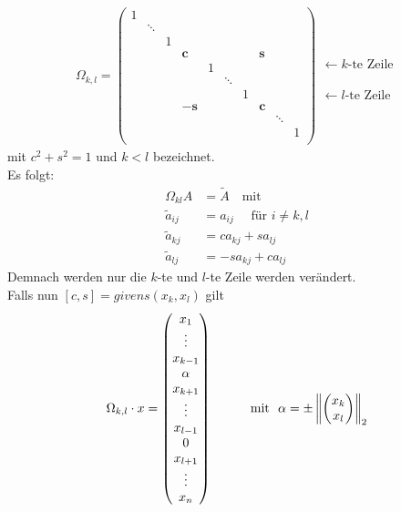 \begin{gather}
\Omega _{k,l} = \begin{pmatrix}
1 &&&&&&&&& \\
& \ddots\\
&& 1\\
&&& \mathbf{c} &&&& \mathbf{s} \\
&&&& 1\\
&&&&& \ddots \\
&&&&&& 1\\
&&& -\mathbf{s} &&&& \mathbf{c} \\
&&&&&&&& \ddots \\
&&&&&&&&& 1\\
\end{pmatrix}
\begin{array}{l}
\\   \leftarrow \text{$k$-te Zeile}
\\ \\ \\ \\ \leftarrow \text{$l$-te Zeile}
\end{array}
\label{VI.4.5}
\end{gather}
mit $c^2+s^2=1$ und $k<l$ bezeichnet.\\
Es folgt:
\begin{align*}
\Omega_{kl} A &= \widetilde{A} \quad \text{mit} \\
\widetilde{a}_{ij}  &= a_{ij} \quad \text{ für } i\neq k,l \\
\widetilde{a}_{kj} & = ca_{kj}+sa_{lj} \\
\widetilde{a}_{lj} & = -sa_{kj} + ca_{lj}
\end{align*}
Demnach werden nur die $k$-te und $l$-te Zeile werden verändert. \\
Falls nun $[c,s] = givens(x_k, x_l)$ gilt
\begin{gather*}
\Omega_{k,l}\cdot x = \begin{pmatrix}
x_1 \\ \vdots \\x_{k-1} \\\alpha \\ x_{k+1}
\\\vdots \\
x_{l-1} \\ 0 \\x_{l+1} \\\vdots \\x_n
\end{pmatrix}
\qquad
\quad \text{mit~~}
\alpha = \pm \left\|   \begin{pmatrix} x_k \\ x_l\end{pmatrix} \right\|_2
\end{gather*}
